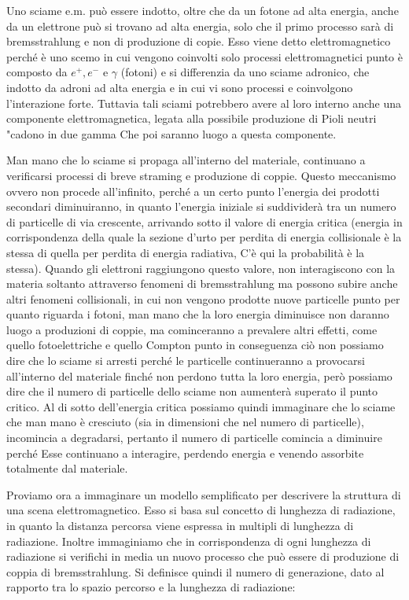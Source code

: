 Uno sciame e.m. può essere indotto, oltre che da un fotone ad alta energia, anche da un elettrone può si trovano ad alta energia, solo che il primo processo sarà di bremsstrahlung e non di produzione di copie. Esso viene detto elettromagnetico perché è uno scemo in cui vengono coinvolti solo processi elettromagnetici punto è composto da $ e^+,e^-$ e $\gamma$ (fotoni) e si differenzia da uno sciame adronico, che indotto da adroni ad alta energia e in cui vi sono processi e coinvolgono l'interazione forte. Tuttavia tali sciami potrebbero avere al loro interno anche una componente elettromagnetica, legata alla possibile produzione di Pioli neutri "cadono in due gamma Che poi saranno luogo a questa componente.

Man mano che lo sciame si propaga all'interno del materiale, continuano a verificarsi processi di breve straming e produzione di coppie. Questo meccanismo ovvero non procede all'infinito, perché a un certo punto l'energia dei prodotti secondari diminuiranno, in quanto l'energia iniziale si suddividerà tra un numero di particelle di via crescente, arrivando sotto il valore di energia critica (energia in corrispondenza della quale la sezione d'urto per perdita di energia collisionale è la stessa di quella per perdita di energia radiativa, C'è qui la probabilità è la stessa). Quando gli elettroni raggiungono questo valore, non interagiscono con la materia soltanto attraverso fenomeni di bremsstrahlung ma possono subire anche altri fenomeni collisionali, in cui non vengono prodotte nuove particelle punto per quanto riguarda i fotoni, man mano che la loro energia diminuisce non daranno luogo a produzioni di coppie, ma cominceranno a prevalere altri effetti, come quello fotoelettriche e quello Compton punto in conseguenza ciò non possiamo dire che lo sciame si arresti perché le particelle continueranno a provocarsi all'interno del materiale finché non perdono tutta la loro energia, però possiamo dire che il numero di particelle dello sciame non aumenterà superato il punto critico. Al di sotto dell'energia critica possiamo quindi immaginare che lo sciame che man mano è cresciuto (sia in dimensioni che nel numero di particelle), incomincia a degradarsi, pertanto il numero di particelle comincia a diminuire perché Esse continuano a interagire, perdendo energia e venendo assorbite totalmente dal materiale.

Proviamo ora a immaginare un modello semplificato per descrivere la struttura di una scena elettromagnetico. Esso si basa sul concetto di lunghezza di radiazione, in quanto la distanza percorsa viene espressa in multipli di lunghezza di radiazione. Inoltre immaginiamo che in corrispondenza di ogni lunghezza di radiazione si verifichi in media un nuovo processo che può essere di produzione di coppia di bremsstrahlung. Si definisce quindi il numero di generazione, dato al rapporto tra lo spazio percorso e la lunghezza di radiazione:

